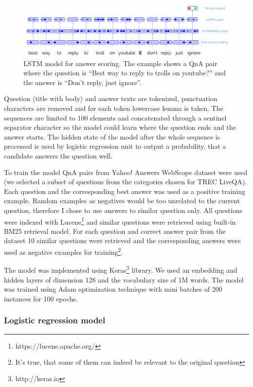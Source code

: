 \documentclass[]{article}
\begin{document}
\begin{figure}
	\includegraphics[width=470px]{img/qa_lstm}
	\caption{LSTM model for answer scoring. The example shows a QnA pair where the question is ``Best way to reply to trolls on youtube?'' and the answer is ``Don't reply, just ignore''.}
	\label{figure:lstm_model}
\end{figure}

Question (title with body) and answer texts are tokenized, punctuation characters are removed and for each token lowercase lemma is taken.
The sequences are limited to 100 elements and concatenated through a sentinel separator character so the model could learn where the question ends and the answer starts.
The hidden state of the model after the whole sequence is processed is used by logistic regression unit to output a probability, that a candidate answers the question well.

To train the model QnA pairs from Yahoo! Answers WebScope dataset were used (we selected a subset of questions from the categories chosen for TREC LiveQA).
Each question and the corresponding best answer was used as a positive training example.
Random examples as negatives would be too unrelated to the current question, therefore I chose to use answers to similar question only.
All questions were indexed with Lucene\footnote{https://lucene.apache.org/} and similar questions were retrieved using built-in BM25 retrieval model.
For each question and correct answer pair from the dataset 10 similar questions were retrieved and the corresponding answers were used as negative examples for training\footnote{It's true, that some of them can indeed be relevant to the original question}.

The model was implemented using Keras\footnote{http://keras.io} library.
We used an embedding and hidden layers of dimension 128 and the vocabulary size of 1M words.
The model was trained using Adam optimization technique \cite{kingma2014adam} with mini batches of 200 instances for 100 epochs.

\subsubsection{Logistic regression model}
\end{document}
